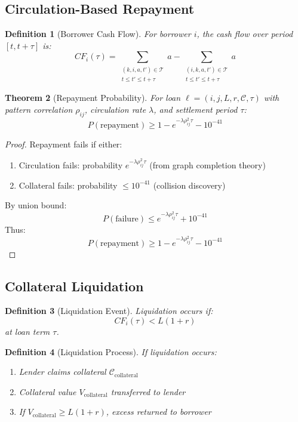\documentclass[12pt]{article}
\newtheorem{theorem}{Theorem}
\newtheorem{definition}[theorem]{Definition}
\begin{document}
\subsection{Circulation-Based Repayment}

\begin{definition}[Borrower Cash Flow]
For borrower $i$, the cash flow over period $[t, t+\tau]$ is:
$$
CF_i(\tau) = \sum_{\substack{(k,i,a,t') \in \mathcal{T} \\ t \leq t' \leq t+\tau}} a - \sum_{\substack{(i,k,a,t') \in \mathcal{T} \\ t \leq t' \leq t+\tau}} a
$$
\end{definition}

\begin{theorem}[Repayment Probability]
For loan $\ell = (i,j,L,r,\mathcal{C},\tau)$ with pattern correlation $\rho_{ij}$, circulation rate $\lambda$, and settlement period $\tau$:
$$
P(\text{repayment}) \geq 1 - e^{-\lambda\rho_{ij}^2 \tau} - 10^{-41}
$$
\end{theorem}

\begin{proof}
Repayment fails if either:
\begin{enumerate}
    \item Circulation fails: probability $e^{-\lambda\rho_{ij}^2\tau}$ (from graph completion theory)
    \item Collateral fails: probability $\leq 10^{-41}$ (collision discovery)
\end{enumerate}
By union bound:
$$
P(\text{failure}) \leq e^{-\lambda\rho_{ij}^2\tau} + 10^{-41}
$$
Thus:
$$
P(\text{repayment}) \geq 1 - e^{-\lambda\rho_{ij}^2\tau} - 10^{-41}
$$
\end{proof}

\subsection{Collateral Liquidation}

\begin{definition}[Liquidation Event]
Liquidation occurs if:
$$
CF_i(\tau) < L(1+r)
$$
at loan term $\tau$.
\end{definition}

\begin{definition}[Liquidation Process]
If liquidation occurs:
\begin{enumerate}
    \item Lender claims collateral $\mathcal{C}_{\text{collateral}}$
    \item Collateral value $V_{\text{collateral}}$ transferred to lender
    \item If $V_{\text{collateral}} \geq L(1+r)$, excess returned to borrower
\end{enumerate}
\end{definition}
\end{document}
